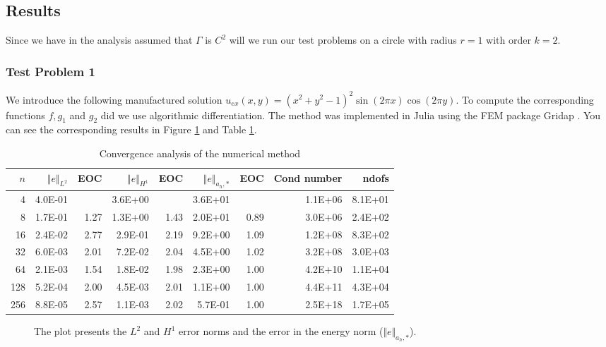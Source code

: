 
\subsection{Results}%
\label{sub:results}



Since we have in the analysis assumed that $\Gamma $ is $C^2 $ will we run our test problems on a circle with radius $r=1$ with order $k=2$.

\subsubsection{Test Problem 1}%
\label{ssub:test_problem_1}


We introduce the following manufactured solution $u_{ex}(x,y) = (x^2 + y^2 - 1)^2 \sin(2\pi x) \cos(2\pi y)$. To compute the corresponding functions $f, g_{1}$ and $g_{2}$ did we use algorithmic differentiation. The method was implemented in Julia
using the FEM package Gridap \cite{verdugo22,julia17}. You can see the corresponding results in Figure \ref{fig:CutFEM_error1} and Table \ref{table:CutFEM_error1}.


\begin{table}[h!]
    \caption{Convergence analysis of the numerical method}
    \label{table:CutFEM_error1}
    \begin{tabular}{rrrrrrrrr}
    \hline\hline
    \textbf{$n$} & \textbf{$\Vert e \Vert_{L^2}$} & \textbf{EOC} & \textbf{$ \Vert e \Vert_{H^1}$} & \textbf{EOC} & \textbf{$\Vert e \Vert_{ a_h,* }$} & \textbf{EOC} & \textbf{Cond number} & \textbf{ndofs} \\\hline
    4 & 4.0E-01 &  & 3.6E+00 &  & 3.6E+01 &  & 1.1E+06 & 8.1E+01 \\
    8 & 1.7E-01 & 1.27 & 1.3E+00 & 1.43 & 2.0E+01 & 0.89 & 3.0E+06 & 2.4E+02 \\
    16 & 2.4E-02 & 2.77 & 2.9E-01 & 2.19 & 9.2E+00 & 1.09 & 1.2E+08 & 8.3E+02 \\
    32 & 6.0E-03 & 2.01 & 7.2E-02 & 2.04 & 4.5E+00 & 1.02 & 3.2E+08 & 3.0E+03 \\
    64 & 2.1E-03 & 1.54 & 1.8E-02 & 1.98 & 2.3E+00 & 1.00 & 4.2E+10 & 1.1E+04 \\
    128 & 5.2E-04 & 2.00 & 4.5E-03 & 2.01 & 1.1E+00 & 1.00 & 4.4E+11 & 4.3E+04 \\
    256 & 8.8E-05 & 2.57 & 1.1E-03 & 2.02 & 5.7E-01 & 1.00 & 2.5E+18 & 1.7E+05 \\\hline\hline
  \end{tabular}
\end{table}


\begin{figure}[h!]
    \centering
    
    \caption{The plot presents the $L^2$ and $H^1$ error norms and the error in the energy norm ($\Vert e \Vert_{a_h,*}$).}
    \label{fig:CutFEM_error1}
\end{figure}

